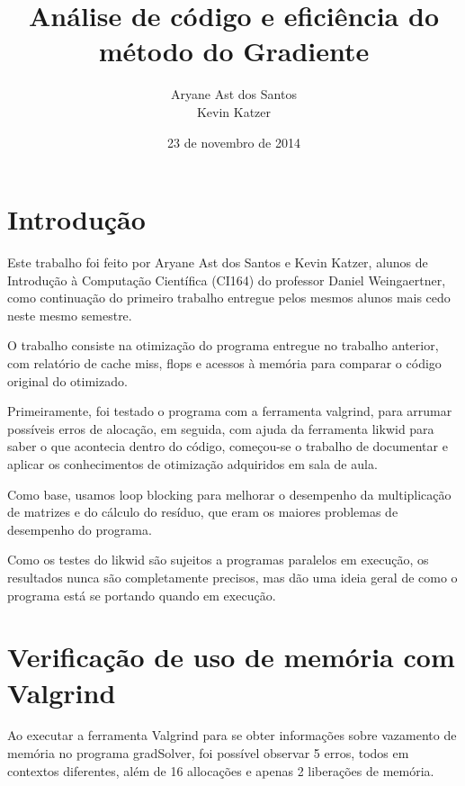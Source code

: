 \documentclass[12pt]{article}
\begin{document}
\setlength{\parskip}{0.2cm}

\title{Análise de código e eficiência do método do Gradiente}

\author{Aryane Ast dos Santos\\ Kevin Katzer}

\date{23 de novembro de 2014}

\maketitle

\tableofcontents

\pagebreak

\section{Introdução}

Este trabalho foi feito por Aryane Ast dos Santos e Kevin Katzer, alunos de 
Introdução à Computação Científica (CI164) do professor Daniel Weingaertner, 
como continuação do primeiro trabalho entregue pelos mesmos alunos mais 
cedo neste mesmo semestre.

O trabalho consiste na otimização do programa entregue no trabalho anterior, 
com relatório de cache miss, flops e acessos à memória para comparar o código 
original do otimizado.

Primeiramente, foi testado o programa com a ferramenta valgrind, para arrumar 
possíveis erros de alocação, em seguida, com ajuda da ferramenta likwid para 
saber o que acontecia dentro do código, começou-se o trabalho de documentar e 
aplicar os conhecimentos de otimização adquiridos em sala de aula.

Como base, usamos loop blocking para melhorar o desempenho da multiplicação 
de matrizes e do cálculo do resíduo, que eram os maiores problemas de 
desempenho do programa.

Como os testes do likwid são sujeitos a programas paralelos em execução, 
os resultados nunca são completamente precisos, mas dão uma ideia geral 
de como o programa está se portando quando em execução.

\section{Verificação de uso de memória com Valgrind}\label{sec:Valgrind}

Ao executar a ferramenta Valgrind para se obter informações sobre vazamento de
memória no programa gradSolver, foi possível observar 5 erros, todos em
contextos diferentes, além de 16 allocações e apenas 2 liberações de memória.
\end{document}
